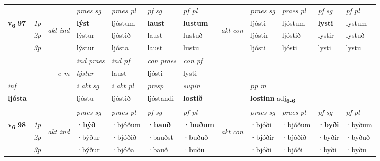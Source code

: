 \begin{longtable}[l]{X>{\footnotesize\itshape}llXXXXlXXXX}
 & &   & \textit{praes sg}  & \textit{praes pl}    & \textit{ pf sg} & \textit{pf pl} & & \textit{praes sg}  & \textit{praes pl}    & \textit{pf sg} & \textit{pf pl }  \\ \cmidrule{4-7} \cmidrule{9-12}
 \multirow{2}{*}{{{\textbf{v{\textsubscript{6}}} \Large{\textbf{97}}}}}  & 1p & \multirow{3}{*}{\begin{turn}{90}\textit{akt ind}\end{turn}} & \textbf{lýst} & ljóstum & \textbf{laust} & \textbf{lustum} & \multirow{3}{*}{\begin{turn}{90}\textit{akt con}\end{turn}} &ljósti & ljóstum & \textbf{lysti} & lystum\\*
 & 2p &  &  lýstur  & ljóstið & laust & lustuð & & ljóstir & ljóstið & lystir & lystuð \\*
 & 3p &  & lýstur & ljósta & laust & lustu & & ljósti & ljósti& lysti & lystu \\*
\cmidrule{4-7} \cmidrule{9-12}

   && &  \textit{ind praes} & \textit{ind pf} & \textit{con praes} & \textit{con pf} \\*
\multicolumn{3}{r}{\textit{e-m}} & lýstur & laust & ljósti & lysti \\*

\cmidrule{4-7}
   {\textit{inf}} & &  & \textit{i akt sg} & \textit{i akt pl}   & \textit{presp} & \textit{supin}  && \textit{pp m} \\*
  {\textbf{ljósta}} & && ljóstu  & ljóstið   & ljóstandi &  \textbf{lostið}  && \multicolumn{2}{l}{\textbf{lostinn} adj\textbf{\textsubscript{6-6}}} \\*

\midrule

 & &   & \textit{praes sg}  & \textit{praes pl}    & \textit{ pf sg} & \textit{pf pl} & & \textit{praes sg}  & \textit{praes pl}    & \textit{pf sg} & \textit{pf pl }  \\ \cmidrule{4-7} \cmidrule{9-12}
 \multirow{2}{*}{{{\textbf{v{\textsubscript{6}}} \Large{\textbf{98}}}}}  & 1p & \multirow{3}{*}{\begin{turn}{90}\textit{akt ind}\end{turn}} & \textbf{·býð} & ·bjóðum & \textbf{·bauð} & \textbf{·buðum} & \multirow{3}{*}{\begin{turn}{90}\textit{akt con}\end{turn}} &·bjóði & ·bjóðum & \textbf{·byði} & ·byðum\\*
 & 2p &  &  ·býður  & ·bjóðið & ·bauðst & ·buðuð & & ·bjóðir & ·bjóðið & ·byðir & ·byðuð \\*
 & 3p &  & ·býður & ·bjóða & ·bauð & ·buðu & & ·bjóði & ·bjóði& ·byði & ·byðu \\*
\cmidrule{4-7} \cmidrule{9-12}


\end{longtable}
